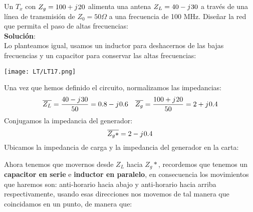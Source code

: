 \documentclass[
	12pt, %
	fleqn, %
	a4paper, %
	oneside, %
]{LegrandOrangeBook}
\begin{document}
\begin{example}
Un $T_x$ con $Z_g=100+{j\mkern1mu} 20$ alimenta una antena $Z_L=40-{j\mkern1mu} 30$ a través de una línea de transmisión de $Z_0=50\Omega$ a una frecuencia de 100 MHz. Diseñar la red que permita el paso de altas frecuencias:\\
\textbf{Solución}:\\
Lo planteamos igual, usamos un inductor para deshacernos de las bajas frecuencias y un capacitor para conservar las altas frecuencias:
\begin{center}
\texttt{[image: LT/LT17.png]}
\end{center}
Una vez que hemos definido el circuito, normalizamos las impedancias:
\begin{align*}
&\overline{Z_L}=\frac{40-{j\mkern1mu} 30}{50}=0.8-{j\mkern1mu} 0.6 &\overline{Z_g}=\frac{100+{j\mkern1mu} 20}{50}=2+{j\mkern1mu} 0.4
\end{align*}
Conjugamos la impedancia del generador:
\begin{displaymath}
\overline{Z_g*}=2-{j\mkern1mu} 0.4
\end{displaymath}
Ubicamos la impedancia de carga y la impedancia del generador en la carta:
\begin{center}
\end{center}
Ahora tenemos que movernos desde $Z_L$ hacia $Z_g*$, recordemos que tenemos un \textbf{capacitor en serie} e \textbf{inductor en paralelo}, en consecuencia los movimientos que haremos son: anti-horario hacia abajo y anti-horario hacia arriba respectivamente, usando esas direcciones nos movemos de tal manera que coincidamos en un punto, de manera que:
\begin{center}
\end{center}
\end{example}
\end{document}
